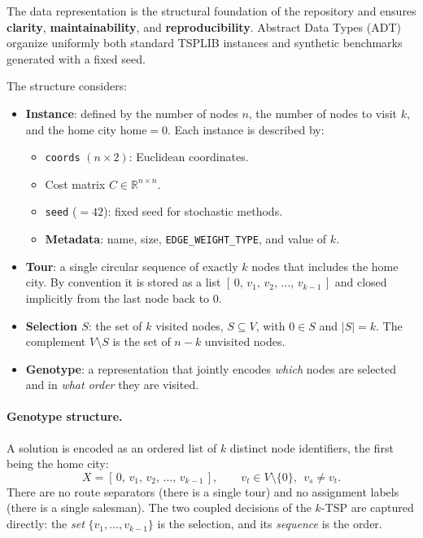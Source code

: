 \documentclass[conference]{IEEEtran}
\begin{document}
The data representation is the structural foundation of the repository and ensures \textbf{clarity}, \textbf{maintainability}, and \textbf{reproducibility}. Abstract Data Types (ADT) organize uniformly both standard TSPLIB instances and synthetic benchmarks generated with a fixed seed.

The structure considers:

\begin{itemize}
    \item \textbf{Instance}: defined by the number of nodes $n$, the number of nodes to visit $k$, and the home city $\mathrm{home}=0$. Each instance is described by:
    \begin{itemize}
        \item \texttt{coords} $(n\times 2)$: Euclidean coordinates.
        \item Cost matrix $C\in\mathbb{R}^{n\times n}$.
        \item \texttt{seed} ($=42$): fixed seed for stochastic methods.
        \item \textbf{Metadata}: name, size, \texttt{EDGE\_WEIGHT\_TYPE}, and value of $k$.
    \end{itemize}

    \item \textbf{Tour}: a single circular sequence of exactly $k$ nodes that includes the home city. By convention it is stored as a list $[\,0,\,v_1,\,v_2,\,\dots,\,v_{k-1}\,]$ and closed implicitly from the last node back to $0$.

    \item \textbf{Selection $S$}: the set of $k$ visited nodes, $S\subseteq V$, with $0\in S$ and $|S|=k$. The complement $V\setminus S$ is the set of $n-k$ unvisited nodes.

    \item \textbf{Genotype}: a representation that jointly encodes \emph{which} nodes are selected and in \emph{what order} they are visited.
\end{itemize}

\paragraph{Genotype structure.}
A solution is encoded as an ordered list of $k$ distinct node identifiers, the first being the home city:
\[
  X=[\,0,\,v_1,\,v_2,\,\dots,\,v_{k-1}\,],\qquad
  v_t\in V\setminus\{0\},\ \ v_s\neq v_t .
\]
There are no route separators (there is a single tour) and no assignment labels (there is a single salesman). The two coupled decisions of the $k$-TSP are captured directly: the \emph{set} $\{v_1,\dots,v_{k-1}\}$ is the selection, and its \emph{sequence} is the order.
\end{document}
